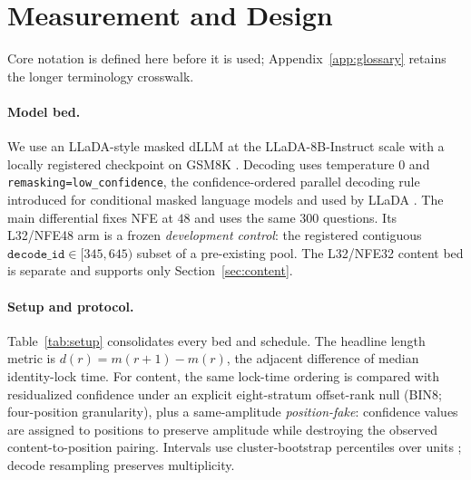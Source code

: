 \documentclass{article}
\begin{document}
\section{Measurement and Design}\label{sec:method}

Core notation is defined here before it is used; Appendix~\ref{app:glossary}
retains the longer terminology crosswalk.

\begin{center}
\end{center}

\paragraph{Model bed.}
We use an LLaDA-style masked dLLM at the LLaDA-8B-Instruct scale with a locally
registered checkpoint on GSM8K \citep{cobbe2021gsm8k}. Decoding uses temperature
$0$ and \texttt{remasking=low\_confidence}, the confidence-ordered parallel
decoding rule introduced for conditional masked language models and used by
LLaDA \citep{ghazvininejad2019maskpredict,nie2025large}. The main differential
fixes NFE at $48$ and uses the same $300$ questions. Its L32/NFE48 arm is a
frozen \emph{development control}: the registered contiguous
$\texttt{decode\_id}\in[345,645)$ subset of a pre-existing pool. The
L32/NFE32 content bed is separate and supports only Section~\ref{sec:content}.

\paragraph{Setup and protocol.}
Table~\ref{tab:setup} consolidates every bed and schedule. The headline length
metric is $d(r)=m(r{+}1)-m(r)$, the adjacent difference of median identity-lock
time. For content, the same lock-time ordering is compared with residualized
confidence under an explicit eight-stratum offset-rank null (BIN8; four-position
granularity), plus a same-amplitude \emph{position-fake}: confidence values are
assigned to positions to preserve amplitude while destroying the observed
content-to-position pairing. Intervals use cluster-bootstrap percentiles over
units \citep{davison1997bootstrap}; decode resampling preserves multiplicity.
\end{document}
